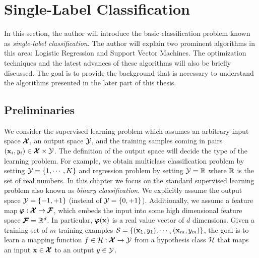 %
\section{Single-Label Classification}\label{sc_slc}

In this section, the author will introduce the basic classification problem known as \textit{single-label classification}.
The author will explain two prominent algorithms in this area: Logistic Regression and Support Vector Machines.
The optimization techniques and the latest advances of these algorithms will also be briefly discussed.
The goal is to provide the background that is necessary to understand the algorithms presented in the later part of this thesis. 



%
%
\subsection{Preliminaries}\label{sc_slc_pn}

We consider the supervised learning problem which assumes an arbitrary input space $\pmb {\mathcal{X}}$, an output space $\mathcal{Y}$, and the training samples coming in pairs $(\mathbf {x}_i,y_i)\in\pmb {\mathcal{X}}\times\mathcal{Y}$.
The definition of the output space will decide the type of the learning problem.
For example, we obtain multiclass classification problem by setting $\mathcal{Y}=\{1,\cdots,K\}$ and regression problem by setting $\mathcal{Y}=\mathbb{R}$ where $\mathbb{R}$ is the set of real numbers.
In this chapter we focus on the standard supervised learning problem also known as \textit{binary classification}.
We explicitly assume the output space $\mathcal{Y}=\{-1,+1\}$ (instead of $\mathcal{Y}=\{0,+1\}$).
Additionally, we assume a feature map $\pmb \varphi:\pmb {\mathcal{X}}\rightarrow\pmb {\mathcal{F}}$, which embeds the input into some high dimensional feature space $\pmb {\mathcal{F}}=\mathbb{R}^d$.
In particular, $\pmb \varphi(\mathbf {x})$ is a real value vector of $d$ dimensions.
Given a training set of $m$ training examples $\mathcal{S}=\{(\mathbf {x}_1,y_1),\cdots,(\mathbf {x}_m,y_m)\}$, the goal is to learn a mapping function $f\in\mathcal{H}:\pmb {\mathcal{X}}\rightarrow\mathcal{Y}$ from a {hypothesis class} $\mathcal{H}$ that maps an input $\mathbf {x}\in\pmb {\mathcal{X}}$ to an output $y\in\mathcal{Y}$. 


